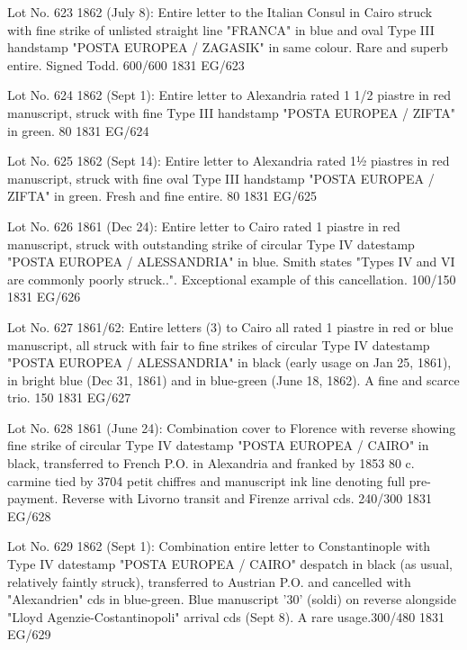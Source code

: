 \documentclass[justified]{tufte-book}
\begin{document}
%
{Lot No. 623
1862 (July 8): Entire letter to the Italian Consul in Cairo struck with fine strike of unlisted straight line "FRANCA" in blue and oval Type III handstamp "POSTA EUROPEA / ZAGASIK" in same colour. Rare and superb entire. Signed Todd. 600/600 }%
{1831}%
{EG/623}%
{}%
{}
{}%
{}

%
{Lot No. 624
1862 (Sept 1): Entire letter to Alexandria rated 1 1/2 piastre in red manuscript, struck with fine Type III handstamp "POSTA EUROPEA / ZIFTA" in green. 80
 }%
{1831}%
{EG/624}%
{}%
{}
{}%
{}

%
{Lot No. 625
1862 (Sept 14): Entire letter to Alexandria rated 1½ piastres in red manuscript, struck with fine oval Type III handstamp "POSTA EUROPEA / ZIFTA" in green. Fresh and fine entire. 80 
}%
{1831}%
{EG/625}%
{}%
{}
{}%
{}

%
{Lot No. 626
1861 (Dec 24): Entire letter to Cairo rated 1 piastre in red manuscript, struck with outstanding strike of circular Type IV datestamp "POSTA EUROPEA / ALESSANDRIA" in blue. Smith states "Types IV and VI are commonly poorly struck..". Exceptional example of this cancellation. 100/150
}%
{1831}%
{EG/626}%
{}%
{}
{}%
{}

%
{
Lot No. 627
1861/62: Entire letters (3) to Cairo all rated 1 piastre in red or blue manuscript, all struck with fair to fine strikes of circular Type IV datestamp "POSTA EUROPEA / ALESSANDRIA" in black (early usage on Jan 25, 1861), in bright blue (Dec 31, 1861) and in blue-green (June 18, 1862). A fine and scarce trio. 150 }%
{1831}%
{EG/627}%
{}%
{}
{}%
{}

%
{Lot No. 628
1861 (June 24): Combination cover to Florence with reverse showing fine strike of circular Type IV datestamp "POSTA EUROPEA / CAIRO" in black, transferred to French P.O. in Alexandria and franked by 1853 80 c. carmine tied by 3704 petit chiffres and manuscript ink line denoting full pre-payment. Reverse with Livorno transit and Firenze arrival cds. 240/300
}%
{1831}%
{EG/628}%
{}%
{}
{}%
{}

%
{Lot No. 629
1862 (Sept 1): Combination entire letter to Constantinople with Type IV datestamp "POSTA EUROPEA / CAIRO" despatch in black (as usual, relatively faintly struck), transferred to Austrian P.O. and cancelled with "Alexandrien" cds in blue-green. Blue manuscript '30' (soldi) on reverse alongside "Lloyd Agenzie-Costantinopoli" arrival cds (Sept 8). A rare usage.300/480 }%
{1831}%
{EG/629}%
{}%
{}
{}%
{}
\end{document}
